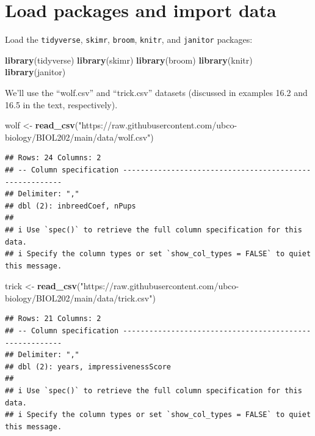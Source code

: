 \documentclass[
]{book}
\newenvironment{Shaded}{\begin{snugshade}}{\end{snugshade}}
\newcommand{\FunctionTok}[1]{\textcolor[rgb]{0.13,0.29,0.53}{\textbf{#1}}}
\newcommand{\NormalTok}[1]{#1}
\newcommand{\OtherTok}[1]{\textcolor[rgb]{0.56,0.35,0.01}{#1}}
\newcommand{\StringTok}[1]{\textcolor[rgb]{0.31,0.60,0.02}{#1}}
\begin{document}
\section{Load packages and import data}\label{twonum_packages_data}

Load the \texttt{tidyverse}, \texttt{skimr}, \texttt{broom}, \texttt{knitr}, and \texttt{janitor} packages:

\begin{Shaded}
\begin{Highlighting}[]
\FunctionTok{library}\NormalTok{(tidyverse)}
\FunctionTok{library}\NormalTok{(skimr)}
\FunctionTok{library}\NormalTok{(broom)}
\FunctionTok{library}\NormalTok{(knitr)}
\FunctionTok{library}\NormalTok{(janitor)}
\end{Highlighting}
\end{Shaded}

We'll use the ``wolf.csv'' and ``trick.csv'' datasets (discussed in examples 16.2 and 16.5 in the text, respectively).

\begin{Shaded}
\begin{Highlighting}[]
\NormalTok{wolf }\OtherTok{\textless{}{-}} \FunctionTok{read\_csv}\NormalTok{(}\StringTok{"https://raw.githubusercontent.com/ubco{-}biology/BIOL202/main/data/wolf.csv"}\NormalTok{)}
\end{Highlighting}
\end{Shaded}

\begin{verbatim}
## Rows: 24 Columns: 2
## -- Column specification --------------------------------------------------------
## Delimiter: ","
## dbl (2): inbreedCoef, nPups
## 
## i Use `spec()` to retrieve the full column specification for this data.
## i Specify the column types or set `show_col_types = FALSE` to quiet this message.
\end{verbatim}

\begin{Shaded}
\begin{Highlighting}[]
\NormalTok{trick }\OtherTok{\textless{}{-}} \FunctionTok{read\_csv}\NormalTok{(}\StringTok{"https://raw.githubusercontent.com/ubco{-}biology/BIOL202/main/data/trick.csv"}\NormalTok{)}
\end{Highlighting}
\end{Shaded}

\begin{verbatim}
## Rows: 21 Columns: 2
## -- Column specification --------------------------------------------------------
## Delimiter: ","
## dbl (2): years, impressivenessScore
## 
## i Use `spec()` to retrieve the full column specification for this data.
## i Specify the column types or set `show_col_types = FALSE` to quiet this message.
\end{verbatim}
\end{document}

